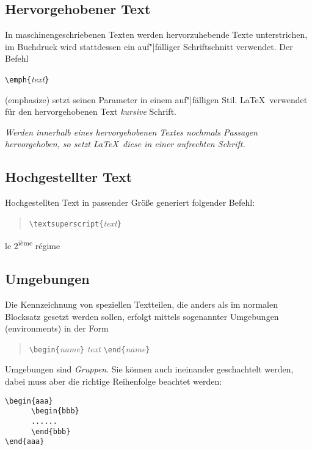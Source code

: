 \subsection{Hervorgehobener Text}

In maschinengeschriebenen Texten werden hervorzuhebende Texte
unterstrichen, im Buchdruck wird stattdessen ein auf"|fälliger
Schriftschnitt verwendet.
Der Befehl
\begin{beispiel}
\lstinline|\emph{|\textit{text}\lstinline|}|
\end{beispiel}
(emphasize) setzt seinen Parameter in einem auf"|fälligen Stil.
\LaTeX\ verwendet für den hervorgehobenen Text \textit{kursive}
Schrift.

\begin{LTXexample}
\emph{Werden innerhalb eines
hervorgehobenen Textes
\emph{nochmals} Passagen
hervorgehoben, so setzt
\LaTeX\ diese in einer
\emph{aufrechten} Schrift.}
\end{LTXexample}



\subsection{Hochgestellter Text}
Hochgestellten Text in passender Größe generiert folgender Befehl:
\begin{quote}
\lstinline|\textsuperscript{|\textit{text}\lstinline|}|
\end{quote}

\begin{LTXexample}
le 2\textsuperscript{i\`eme}
r\'egime
\end{LTXexample}





\subsection{Umgebungen} \label{env}

Die Kennzeichnung von speziellen Textteilen, die anders als im
normalen Blocksatz gesetzt werden sollen, erfolgt mittels
sogenannter Umgebungen (environments) in der Form
\begin{quote}
\lstinline|\begin{|\textit{name}\lstinline|}|\quad
   \textit{text}\quad
   \lstinline|\end{|\textit{name}\lstinline|}|
\end{quote}
Umgebungen sind \emph{Gruppen}.
Sie können auch ineinander geschachtelt werden, dabei muss aber
die richtige Reihenfolge beachtet werden:
\begin{beispiel}
\begin{lstlisting}
\begin{aaa}
      \begin{bbb}
      ......
      \end{bbb}
\end{aaa}
\end{lstlisting}
\end{beispiel}


